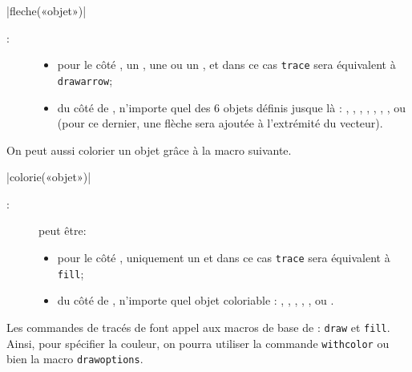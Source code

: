 \documentclass[a4paper,french]{article}
\begin{document}
\begin{colourband}
\macro|fleche(«objet»)|
\begin{description}
  \item[:] 
  \begin{itemize}
    \item pour le côté \MP, un , une
   ou  un , et dans ce cas \lstinline+trace+ sera
  équivalent à \lstinline+drawarrow+;
    \item du côté de \mpgeomdd,
  n'importe quel des 6 objets définis jusque là : ,
  , , , ,
  , ,
   ou  (pour ce dernier, une flèche sera
  ajoutée à l'extrémité du vecteur).
  \end{itemize}
\end{description}
\end{colourband}

On peut aussi colorier un objet grâce à la macro suivante.
\begin{colourband}
\macro|colorie(«objet»)|
\begin{description}
  \item[:] peut être:
  \begin{itemize}
    \item pour le côté \MP, uniquement un  et dans ce cas \lstinline+trace+ sera équivalent à \lstinline+fill+;
    \item du côté de \mpgeomdd,
  n'importe quel objet coloriable : ,
   , , , , ou
  .
  \end{itemize}
\end{description}
\end{colourband}


Les commandes de tracés de \mpgeomdd font appel aux macros de
base de \MP : \lstinline+draw+ et \lstinline+fill+. Ainsi, pour spécifier la
couleur, on pourra
utiliser la commande \lstinline+withcolor+ ou bien la macro
\lstinline+drawoptions+.
\end{document}
